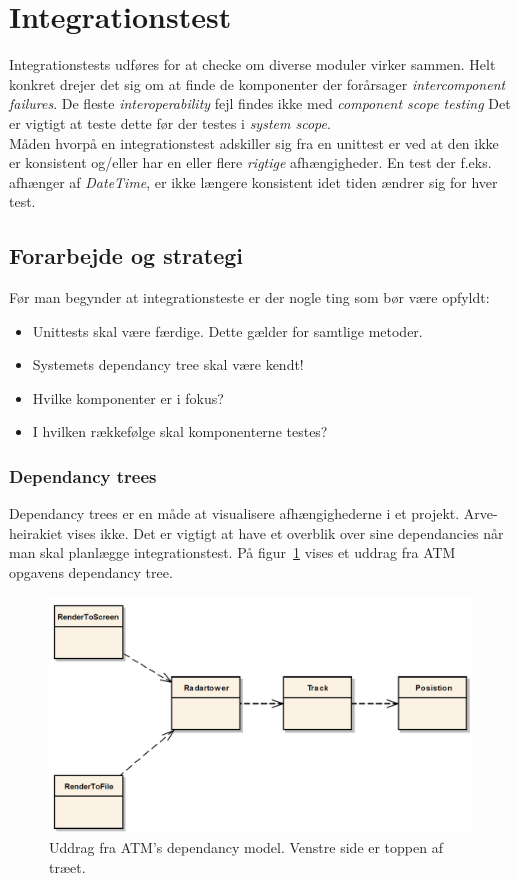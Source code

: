 \section{Integrationstest}
Integrationstests udføres for at checke om diverse moduler virker sammen. Helt konkret drejer det sig om at finde de komponenter der forårsager \textit{intercomponent failures}. De fleste \textit{interoperability} fejl findes ikke med \textit{component scope testing} Det er vigtigt at teste dette før der testes i \textit{system scope}.\\

Måden hvorpå en integrationstest adskiller sig fra en unittest er ved at den ikke er konsistent og/eller har en eller flere \textit{rigtige} afhængigheder. En test der f.eks. afhænger af \textit{DateTime}, er ikke længere konsistent idet tiden ændrer sig for hver test.

\subsection{Forarbejde og strategi}

Før man begynder at integrationsteste er der nogle ting som bør være opfyldt:

\begin{itemize}
	\item Unittests skal være færdige. Dette gælder for samtlige metoder.
	\item Systemets dependancy tree skal være kendt!
	\item Hvilke komponenter er i fokus?
	\item I hvilken rækkefølge skal komponenterne testes?
\end{itemize}

\subsubsection{Dependancy trees}
Dependancy trees er en måde at visualisere afhængighederne i et projekt. Arve-heirakiet vises ikke. Det er vigtigt at have et overblik over sine dependancies når man skal planlægge integrationstest. På figur~\ref{fig:dependancyATM} vises et uddrag fra ATM opgavens dependancy tree.

\begin{figure}[H]
	\centering
	\includegraphics[width=0.78\linewidth]{figs/dependancyATM.PNG}
	\caption{Uddrag fra ATM's dependancy model. Venstre side er toppen af træet.}
	\label{fig:dependancyATM}
\end{figure}

